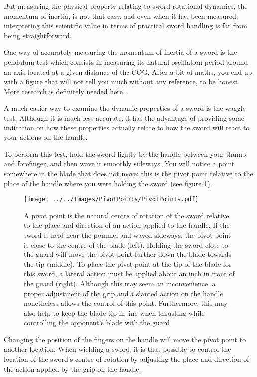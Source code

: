 But measuring the physical property relating to sword rotational dynamics, the momentum of inertia, is not that easy, and even when it has been measured, interpreting this scientific value in terms of practical sword handling is far from being straightforward. 

One way of accurately measuring the momentum of inertia of a sword is the pendulum test which consists in measuring its natural oscillation period around an axis located at a given distance of the COG. After a bit of maths, you end up with a figure that will not tell you much without any reference, to be honest. More research is definitely needed here.

A much easier way to examine the dynamic properties of a sword is the waggle test. Although it is much less accurate, it has the advantage of providing some indication on how these properties actually relate to how the sword will react to your actions on the handle.

To perform this test, hold the sword lightly by the handle between your thumb and forefinger, and then wave it smoothly sideways. You will notice a point somewhere in the blade that does not move: this is the pivot point relative to the place of the handle where you were holding the sword (see figure \ref{fig:pivot_points}).

\begin{figure}[ht]
\centering
	\texttt{[image: ../../Images/PivotPoints/PivotPoints.pdf]}
	\caption[Pivot points]{A pivot point is the natural centre of rotation of the sword relative to the place and direction of an action applied to the handle. If the sword is held near the pommel and waved sideways, the pivot point is close to the centre of the blade (left). Holding the sword close to the guard will move the pivot point further down the blade towards the tip (middle). To place the pivot point at the tip of the blade for this sword, a lateral action must be applied about an inch in front of the guard (right). Although this may seem an inconvenience, a proper adjustment of the grip and a slanted action on the handle nonetheless allows the control of this point. Furthermore, this may also help to keep the blade tip in line when thrusting while controlling the opponent's blade with the guard.}
	\label{fig:pivot_points}
\end{figure}

Changing the position of the fingers on the handle will move the pivot point to another location. When wielding a sword, it is thus possible to control the location of the sword's centre of rotation by adjusting the place and direction of the action applied by the grip on the handle.

